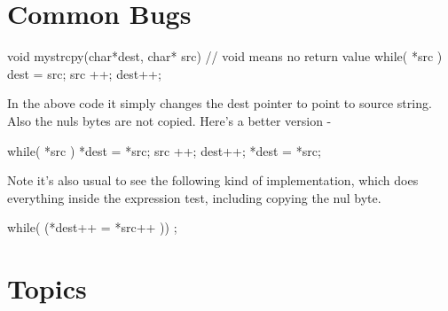 \begin{comment}
*/


strcpy(bhuvan_name->c_str, to_convert);
/*
Now our string is filled in correctly at the end of the struct

                ___ ___ ___ ___ ___ ___ ___ ___ ___ ___ ____
 bhuvan_name = | 0 | 0 | 0 | 6 | b | h | u | v | a | n | \0 |
                                                           ‾
*/

strcmp(bhuvan_name->c_str, "bhuvan") == 0 //The strings are equal!
\end{code}

\end{comment}

\section{Common Bugs}

\begin{code}[language=C]
void mystrcpy(char*dest, char* src) { 
  // void means no return value   
  while( *src ) { dest = src; src ++; dest++; }  
}
\end{code}

In the above code it simply changes the dest pointer to point to source
string. Also the nuls bytes are not copied. Here's a better version -

\begin{code}[language=C]
  while( *src ) { *dest = *src; src ++; dest++; } 
  *dest = *src;
\end{code}

Note it's also usual to see the following kind of implementation, which
does everything inside the expression test, including copying the nul
byte.

\begin{code}[language=C]
  while( (*dest++ = *src++ )) {};
\end{code}

\section{Topics}

